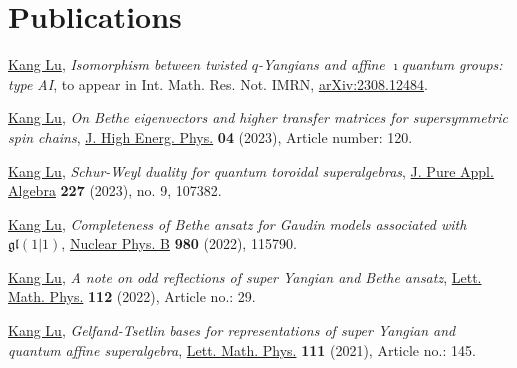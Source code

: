 \documentclass[11pt,letterpaper,roman,colorlinks,urlcolor=blue,linkcolor=blue
]{moderncv}
\begin{document}
\section{Publications}

\begin{etaremune}[leftmargin=1.17cm]
\item \underline{Kang Lu}, {\textit{Isomorphism between twisted $q$-Yangians and affine $\imath$quantum groups: type AI}}, to appear in Int. Math. Res. Not. IMRN,  \href{https://arxiv.org/abs/2308.12484}{arXiv:2308.12484}. 

\item \underline{Kang Lu}, {\textit{On Bethe eigenvectors and higher transfer matrices for supersymmetric spin chains}}, \href{https://doi.org/10.1007/JHEP04(2023)120}{J. High Energ. Phys.} \textbf{04} (2023), Article number: 120.

\item \underline{Kang Lu}, {\textit{Schur-Weyl duality for quantum toroidal superalgebras}}, \href{https://doi.org/10.1016/j.jpaa.2023.107382}{J. Pure Appl. Algebra} \textbf{227} (2023), no. 9, 107382.


\item \underline{Kang Lu}, {\textit{Completeness of Bethe ansatz for Gaudin models associated with} $\mathfrak{gl}(1|1)$}, \href{https://www.sciencedirect.com/science/article/pii/S0550321322001419}{Nuclear Phys. B} \textbf{980} (2022), 115790.

\item \underline{Kang Lu}, {\textit{A note on odd reflections of super Yangian and Bethe ansatz}}, \href{https://link.springer.com/article/10.1007/s11005-022-01524-3}{Lett. Math. Phys.} \textbf{112} (2022), Article no.: 29.

\item \underline{Kang Lu}, {\textit{Gelfand-Tsetlin bases for representations of super Yangian and quantum affine superalgebra}}, \href{https://link.springer.com/article/10.1007/s11005-021-01488-w}{Lett. Math. Phys.} \textbf{111} (2021), Article no.: 145.


\end{etaremune}
\end{document}
